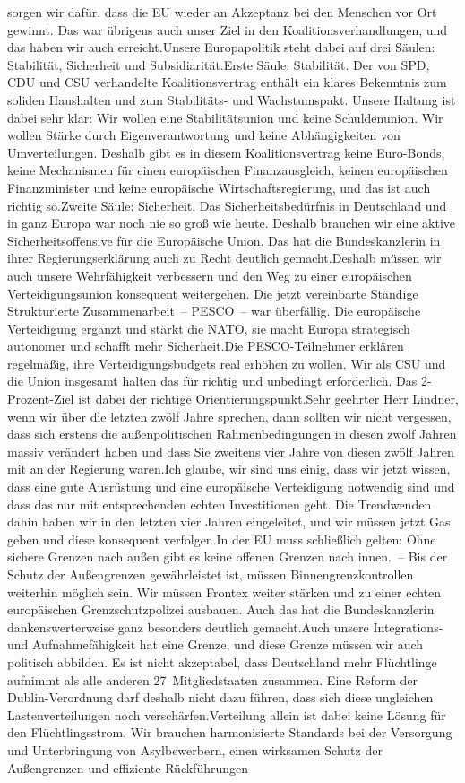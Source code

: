 \documentclass{article}
\begin{document}
sorgen wir dafür, dass die EU wieder an Akzeptanz bei den Menschen vor Ort gewinnt. Das war übrigens auch unser Ziel in den Koalitionsverhandlungen, und das haben wir auch erreicht.Unsere Europapolitik steht dabei auf drei Säulen: Stabilität, Sicherheit und Subsidiarität.Erste Säule: Stabilität. Der von SPD, CDU und CSU verhandelte Koalitionsvertrag enthält ein klares Bekenntnis zum soliden Haushalten und zum Stabilitäts- und Wachstumspakt. Unsere Haltung ist dabei sehr klar: Wir wollen eine Stabilitätsunion und keine Schuldenunion. Wir wollen Stärke durch Eigenverantwortung und keine Abhängigkeiten von Umverteilungen. Deshalb gibt es in diesem Koalitionsvertrag keine Euro-Bonds, keine Mechanismen für einen europäischen Finanzausgleich, keinen europäischen Finanzminister und keine europäische Wirtschaftsregierung, und das ist auch richtig so.Zweite Säule: Sicherheit. Das Sicherheitsbedürfnis in Deutschland und in ganz Europa war noch nie so groß wie heute. Deshalb brauchen wir eine aktive Sicherheitsoffensive für die Europäische Union. Das hat die Bundeskanzlerin in ihrer Regierungserklärung auch zu Recht deutlich gemacht.Deshalb müssen wir auch unsere Wehrfähigkeit verbessern und den Weg zu einer europäischen Verteidigungsunion konsequent weitergehen. Die jetzt vereinbarte Ständige Strukturierte Zusammenarbeit – ­PESCO – war überfällig. Die europäische Verteidigung ergänzt und stärkt die NATO, sie macht Europa strategisch autonomer und schafft mehr Sicherheit.Die PESCO-Teilnehmer erklären regelmäßig, ihre Verteidigungsbudgets real erhöhen zu wollen. Wir als CSU und die Union insgesamt halten das für richtig und unbedingt erforderlich. Das 2-Prozent-Ziel ist dabei der richtige Orientierungspunkt.Sehr geehrter Herr Lindner, wenn wir über die letzten zwölf Jahre sprechen, dann sollten wir nicht vergessen, dass sich erstens die außenpolitischen Rahmenbedingungen in diesen zwölf Jahren massiv verändert haben und dass Sie zweitens vier Jahre von diesen zwölf Jahren mit an der Regierung waren.Ich glaube, wir sind uns einig, dass wir jetzt wissen, dass eine gute Ausrüstung und eine europäische Verteidigung notwendig sind und dass das nur mit entsprechenden echten Investitionen geht. Die Trendwenden dahin haben wir in den letzten vier Jahren eingeleitet, und wir müssen jetzt Gas geben und diese konsequent verfolgen.In der EU muss schließlich gelten: Ohne sichere Grenzen nach außen gibt es keine offenen Grenzen nach innen. – Bis der Schutz der Außengrenzen gewährleistet ist, müssen Binnengrenzkontrollen weiterhin möglich sein. Wir müssen Frontex weiter stärken und zu einer echten europäischen Grenzschutzpolizei ausbauen. Auch das hat die Bundeskanzlerin dankenswerterweise ganz besonders deutlich gemacht.Auch unsere Integrations- und Aufnahmefähigkeit hat eine Grenze, und diese Grenze müssen wir auch politisch abbilden. Es ist nicht akzeptabel, dass Deutschland mehr Flüchtlinge aufnimmt als alle anderen 27 Mitgliedstaaten zusammen. Eine Reform der Dublin-Verordnung darf deshalb nicht dazu führen, dass sich diese ungleichen Lastenverteilungen noch verschärfen.Verteilung allein ist dabei keine Lösung für den Flüchtlingsstrom. Wir brauchen harmonisierte Standards bei der Versorgung und Unterbringung von Asylbewerbern, einen wirksamen Schutz der Außengrenzen und effiziente Rückführungen 
\end{document}

